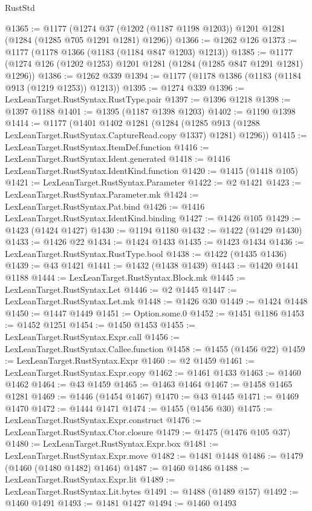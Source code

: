\begin{lexlean}{RustStd}
\begin{coremodule}
@1365 := @1177
    (@1274 @37 (@1202 (@1187 @1198 @1203)) @1201 @1281 (@1284 (@1285 @705 @1291 @1281) @1296))
@1366 := @1262 @126
@1373 := @1177 (@1178 @1366 (@1183 (@1184 @847 @1203) @1213))
@1385 := @1177 (@1274 @126 (@1202 @1253) @1201 @1281 (@1284 (@1285 @847 @1291 @1281) @1296))
@1386 := @1262 @339
@1394 := @1177 (@1178 @1386 (@1183 (@1184 @913 (@1219 @1253)) @1213))
@1395 := @1274 @339
@1396 := LexLeanTarget.RustSyntax.RustType.pair
@1397 := @1396 @1218
@1398 := @1397 @1188
@1401 := @1395 (@1187 @1398 @1203)
@1402 := @1190 @1398
@1414 := @1177
    (@1401
      @1402
      @1281
      (@1284 (@1285 @913 (@1288 LexLeanTarget.RustSyntax.CaptureRead.copy @1337) @1281) @1296))
@1415 := LexLeanTarget.RustSyntax.ItemDef.function
@1416 := LexLeanTarget.RustSyntax.Ident.generated
@1418 := @1416 LexLeanTarget.RustSyntax.IdentKind.function
@1420 := @1415 (@1418 @105)
@1421 := LexLeanTarget.RustSyntax.Parameter
@1422 := @2 @1421
@1423 := LexLeanTarget.RustSyntax.Parameter.mk
@1424 := LexLeanTarget.RustSyntax.Pat.bind
@1426 := @1416 LexLeanTarget.RustSyntax.IdentKind.binding
@1427 := @1426 @105
@1429 := @1423 (@1424 @1427)
@1430 := @1194 @1180
@1432 := @1422 (@1429 @1430)
@1433 := @1426 @22
@1434 := @1424 @1433
@1435 := @1423 @1434
@1436 := LexLeanTarget.RustSyntax.RustType.bool
@1438 := @1422 (@1435 @1436)
@1439 := @43 @1421
@1441 := @1432 (@1438 @1439)
@1443 := @1420 @1441 @1188
@1444 := LexLeanTarget.RustSyntax.Block.mk
@1445 := LexLeanTarget.RustSyntax.Let
@1446 := @2 @1445
@1447 := LexLeanTarget.RustSyntax.Let.mk
@1448 := @1426 @30
@1449 := @1424 @1448
@1450 := @1447 @1449
@1451 := Option.some.{0}
@1452 := @1451 @1186
@1453 := @1452 @1251
@1454 := @1450 @1453
@1455 := LexLeanTarget.RustSyntax.Expr.call
@1456 := LexLeanTarget.RustSyntax.Callee.function
@1458 := @1455 (@1456 @22)
@1459 := LexLeanTarget.RustSyntax.Expr
@1460 := @2 @1459
@1461 := LexLeanTarget.RustSyntax.Expr.copy
@1462 := @1461 @1433
@1463 := @1460 @1462
@1464 := @43 @1459
@1465 := @1463 @1464
@1467 := @1458 @1465 @1281
@1469 := @1446 (@1454 @1467)
@1470 := @43 @1445
@1471 := @1469 @1470
@1472 := @1444 @1471
@1474 := @1455 (@1456 @30)
@1475 := LexLeanTarget.RustSyntax.Expr.construct
@1476 := LexLeanTarget.RustSyntax.Ctor.closure
@1479 := @1475 (@1476 @105 @37)
@1480 := LexLeanTarget.RustSyntax.Expr.box
@1481 := LexLeanTarget.RustSyntax.Expr.move
@1482 := @1481 @1448
@1486 := @1479 (@1460 (@1480 @1482) @1464)
@1487 := @1460 @1486
@1488 := LexLeanTarget.RustSyntax.Expr.lit
@1489 := LexLeanTarget.RustSyntax.Lit.bytes
@1491 := @1488 (@1489 @157)
@1492 := @1460 @1491
@1493 := @1481 @1427
@1494 := @1460 @1493

\end{coremodule}
\end{lexlean}
